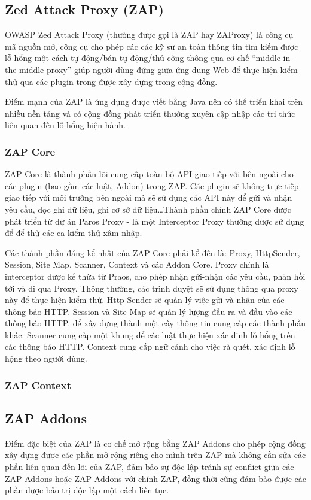 \documentclass[./../main.tex]{subfiles}
\begin{document}
\subsection{Zed Attack Proxy (ZAP)}
OWASP Zed Attack Proxy (thường được gọi là  ZAP hay ZAProxy) là công cụ mã nguồn mở,
công cụ cho phép các các kỹ sư an toàn thông tin tìm kiếm được lỗ hổng một cách tự
động/bán tự động/thủ công thông qua cơ chế “middle-in-the-middle-proxy” giúp người
dùng đứng giữa ứng dụng Web để thực hiện kiểm thử qua các plugin trong được xây dựng
trong cộng đồng.

Điểm mạnh của ZAP là ứng dụng được viết bằng Java nên có thể triển khai trên
nhiều nền tảng và có cộng đồng phát triển thường xuyên cập nhập các tri thức
liên quan đến lỗ hổng hiện hành.

\subsubsection{ZAP Core}

ZAP Core là thành phần lõi cung cấp toàn bộ API giao tiếp với bên ngoài cho các
plugin (bao gồm các luật, Addon) trong ZAP. Các plugin sẽ không trực tiếp giao tiếp
với môi trường bên ngoài mà sẽ sử dụng các API này để  gửi và nhận yêu cầu, đọc ghi
dữ liệu, ghi cơ sở dữ liệu\ldots Thành phần chính ZAP Core được phát triển từ dự án
Paros Proxy - là một Interceptor Proxy thường được sử dụng để để thử các ca kiểm thử
xâm nhập.

Các thành phần đáng kể nhất của ZAP Core phải kể đến là: Proxy, HttpSender, Session,
Site Map, Scanner, Context và các Addon Core. Proxy chính là interceptor được kế thừa
từ Praos, cho phép nhặn gửi-nhận các yêu cầu, phản hồi tới và đi qua Proxy. Thông
thường, các trình duyệt sẽ sử dụng thông qua proxy này để thực hiện kiểm thử. Http
Sender sẽ quản lý việc gửi và nhận của các thông báo HTTP. Session và Site Map sẽ quản lý
lượng đầu ra và đầu vào các thông báo HTTP, để xây dựng thành một cây thông tin cung
cấp các thành phần khác. Scanner cung cấp một khung để các luật thực hiện xác định
lỗ hổng trên các thông báo HTTP. Context cung cấp ngữ cảnh cho việc rà quét, xác định
lỗ hộng theo người dùng.

\subsubsection{ZAP Context}

\subsection{ZAP Addons}
Điểm đặc biệt của ZAP là cơ chế mở rộng bằng ZAP Addons cho phép cộng đồng xây dựng được các phần mở rộng riêng cho mình trên ZAP mà không cần sửa các phần liên quan đến lõi của
ZAP, đảm bảo sự độc lập tránh sự conflict giữa các ZAP Addons hoặc ZAP Addons với chính ZAP, đồng thời cũng đảm bảo được các phần được bảo trị độc lập một cách liên tục.
\end{document}
